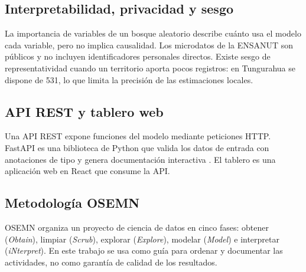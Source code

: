 \subsection{Interpretabilidad, privacidad y sesgo}
La importancia de variables de un bosque aleatorio describe cuánto usa el modelo cada variable, pero no implica causalidad. Los microdatos de la ENSANUT son públicos y no incluyen identificadores personales directos. Existe sesgo de representatividad cuando un territorio aporta pocos registros: en Tungurahua se dispone de \num{531}, lo que limita la precisión de las estimaciones locales.

\subsection{API REST y tablero web}
Una API REST expone funciones del modelo mediante peticiones HTTP. FastAPI es una biblioteca de Python que valida los datos de entrada con anotaciones de tipo y genera documentación interactiva \cite{ramirez2022deploying}. El tablero es una aplicación web en React que consume la API.

\subsection{Metodología OSEMN}
OSEMN organiza un proyecto de ciencia de datos en cinco fases: obtener (\textit{Obtain}), limpiar (\textit{Scrub}), explorar (\textit{Explore}), modelar (\textit{Model}) e interpretar (\textit{iNterpret}). En este trabajo se usa como guía para ordenar y documentar las actividades, no como garantía de calidad de los resultados.
